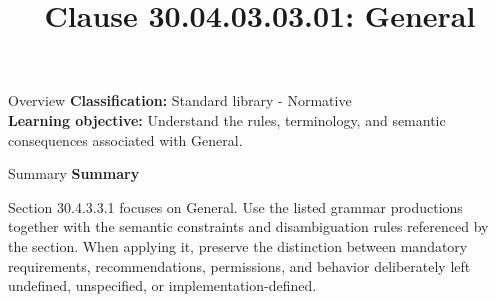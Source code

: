 \documentclass[10pt,letterpaper]{article}
\title{Clause 30.04.03.03.01: General}
\author{}
\date{}
\begin{document}
\maketitle
\begin{CornellOverviewBox}{Overview}
\textbf{Classification:} Standard library - Normative\\[2pt]
\textbf{Learning objective:} Understand the rules, terminology, and semantic consequences associated with General.
\end{CornellOverviewBox}\begin{CornellSummaryBox}{Summary}
{\sffamily\bfseries\color{Accent} Summary}\par\vspace{3pt}Section 30.4.3.3.1 focuses on General. Use the listed grammar productions together with the semantic constraints and disambiguation rules referenced by the section. When applying it, preserve the distinction between mandatory requirements, recommendations, permissions, and behavior deliberately left undefined, unspecified, or implementation-defined.
\end{CornellSummaryBox}
\end{document}
